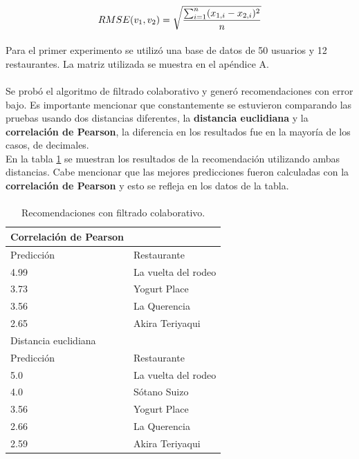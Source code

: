 \documentclass[12pt,letterpaper,oneside] {memoir}
\begin{document}
\begin{equation}
\displaystyle RMSE(v_{1},v_{2}) = \sqrt{\sum_{i=1}^{n}(x_{1,i}-x_{2,i})^{2}\over n}
\end{equation}

\paragraph{}
Para el primer experimento se utilizó una base de datos de 50 usuarios y 12 restaurantes.  La matriz utilizada se muestra en el apéndice A.
\paragraph*{}
Se probó el algoritmo de filtrado colaborativo y generó recomendaciones con error bajo. Es importante mencionar que constantemente se estuvieron comparando las pruebas usando dos distancias diferentes, la \textbf{distancia euclidiana} y la \textbf{correlación de Pearson}, la diferencia en los resultados fue en la mayoría de los casos, de decimales.\\


En la tabla \ref{tab:TableRecom} se muestran los resultados de la recomendación utilizando ambas distancias. Cabe mencionar que las mejores predicciones fueron calculadas con la \textbf{correlación de Pearson} y esto se refleja en los datos de la tabla.
\paragraph*{}
\begin{table}[H]
	\caption{Recomendaciones con filtrado colaborativo.} \begin{center}
\linespread{0.9}\selectfont
\begin{tabular}{>{\footnotesize}p{2.0in}>{\footnotesize}p{2.0in}}
\hline
Correlación de Pearson &  \\
\hline                    
Predicción  & Restaurante    \\
\hline             
4.99  & La vuelta del rodeo  \\
3.73  & Yogurt Place         \\
3.56  & La Querencia         \\
2.65  & Akira Teriyaqui      \\
\hline
Distancia euclidiana       & \\
\hline                    
Predicción  & Restaurante    \\
\hline
5.0   & La vuelta del rodeo  \\
4.0   & Sótano Suizo         \\
3.56  & Yogurt Place         \\
2.66  & La Querencia         \\
2.59  & Akira Teriyaqui      \\
\hline
\end{tabular}
\label{tab:TableRecom}
\end{center}
\end{table}
\end{document}
